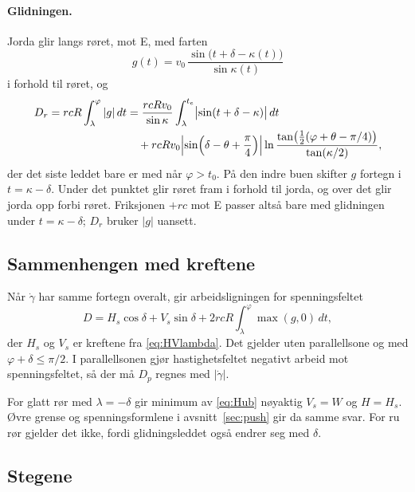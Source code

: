 \documentclass[11pt,a4paper]{article}
\begin{document}
\paragraph{Glidningen.}  Jorda glir langs røret, mot E, med farten
\begin{equation}
  g(t) = v_0\,\frac{\sin\bigl(t + \delta - \kappa(t)\bigr)}{\sin\kappa(t)}
\end{equation}
i forhold til røret, og
\begin{align}
  D_r = r c R \int_\lambda^\varphi |g|\,dt
     &= \frac{r c R v_0}{\sin\kappa}\int_\lambda^{t_e} \bigl|\sin(t + \delta - \kappa)\bigr|\,dt
        \nonumber\\
     &\quad + r c R v_0 \Bigl|\sin\Bigl(\delta - \theta + \frac{\pi}{4}\Bigr)\Bigr|
          \ln\frac{\tan\bigl(\tfrac12(\varphi + \theta - \pi/4)\bigr)}{\tan(\kappa/2)} ,
\end{align}
der det siste leddet bare er med når $\varphi > t_0$.  På den indre buen
skifter $g$ fortegn i $t = \kappa - \delta$.  Under det punktet glir røret
fram i forhold til jorda, og over det glir jorda opp forbi røret.  Friksjonen
$+rc$ mot E passer altså bare med glidningen under $t = \kappa - \delta$;
$D_r$ bruker $|g|$ uansett.

\subsection*{Sammenhengen med kreftene}

Når $\dot\gamma$ har samme fortegn overalt, gir arbeidsligningen for
spenningsfeltet
\begin{equation}
  D = H_s\cos\delta + V_s\sin\delta + 2 r c R \int_\lambda^\varphi \max(g, 0)\,dt ,
\end{equation}
der $H_s$ og $V_s$ er kreftene fra \eqref{eq:HVlambda}.  Det gjelder uten
parallellsone og med $\varphi + \delta \le \pi/2$.  I parallellsonen gjør
hastighetsfeltet negativt arbeid mot spenningsfeltet, så der må $D_p$
regnes med $|\dot\gamma|$.

For glatt rør med $\lambda = -\delta$ gir minimum av \eqref{eq:Hub} nøyaktig
$V_s = W$ og $H = H_s$.  Øvre grense og spenningsformlene i
avsnitt~\ref{sec:push} gir da samme svar.  For ru rør gjelder det ikke,
fordi glidningsleddet også endrer seg med $\delta$.

\subsection*{Stegene}
\end{document}

